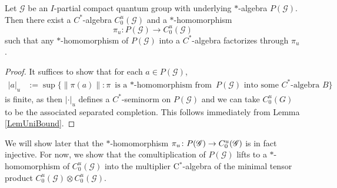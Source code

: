 \begin{Prop}
Let $\mathscr{G}$ be an $I$-partial compact quantum group with underlying
$*$-algebra $P(\mathscr{G})$. Then
  there exist a $C^{*}$-algebra $C^{u}_{0}(\mathscr{G})$ and a
  $*$-homomorphism \[\pi_{u} \colon P(\mathscr{G}) \to
  C^{u}_{0}(\mathscr{G}) \] such that any $*$-homomorphism of
  $P(\mathscr{G})$ into a $C^{*}$-algebra factorizes through
  $\pi_{u}$.
\end{Prop}
\begin{proof}
It suffices to show that for each $a \in P(\mathscr{G})$,
\begin{align*} 
  |a|_{u}&:= \sup \{ \|\pi(a)\| : \pi \text{ is a $*$-homomorphism from } P(\mathscr{G})
  \text{ into some $C^{*}$-algebra } B\}
\end{align*}
is finite, as then $|\cdot |_{u}$ defines a $C^{*}$-seminorm on
$P(\mathscr{G})$ and we can take $C^{u}_{0}(G)$ to be the associated
separated completion. This follows immediately from Lemma \ref{LemUniBound}.
\end{proof}


We will show later that the $*$-homomorphism $\pi_{u}
\colon P(\mathscr{G}) \to C^{u}_{0}(\mathscr{G})$ is in fact injective. For now, we show that the comultiplication of $P(\mathscr{G})$ lifts to a $*$-homomorphism  of
$C^{u}_{0}(\mathscr{G})$ into the multiplier C$^*$-algebra of the minimal tensor product
$C^{u}_{0}(\mathscr{G}) \otimes
C^{u}_{0}(\mathscr{G})$.



